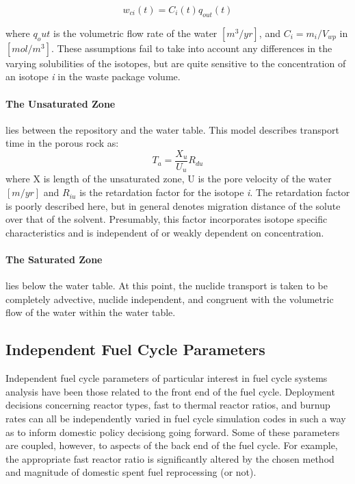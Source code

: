 \begin{equation}
  w_{ci}(t)=C_i(t)q_{out}(t) 
\end{equation}

where $q_out$ is the volumetric flow rate of the water $[m^3/yr]$, and $C_i =
m_i/V_{wp}$ in $[mol/m^3]$. These assumptions fail to take into account any
differences in the varying solubilities of the isotopes, but are quite
sensitive to the concentration of an isotope \emph{i} in the waste package
volume.  

\paragraph{The Unsaturated Zone} lies between the repository and the water
table. This model describes transport time in the porous rock as:
\begin{equation} T_a= \frac{X_u}{U_u}R_{du} \end{equation} where X is length of
the unsaturated zone, U is the pore velocity of the water $[m/yr]$ and $R_{iu}$
is the retardation factor for the isotope \emph{i}. The retardation factor is
poorly described here, but in general denotes migration distance of the solute
over that of the solvent. Presumably, this factor incorporates isotope specific
characteristics and is independent of or weakly dependent on concentration.  

\paragraph{The Saturated Zone} lies below the water table. At this point, the
nuclide transport is taken to be completely advective, nuclide independent, and
congruent with the volumetric flow of the water within the water table. 



\subsection{Independent Fuel Cycle Parameters} Independent fuel cycle
parameters of particular interest in fuel cycle systems analysis have been
those related to the front end of the fuel cycle. Deployment decisions
concerning reactor types, fast to thermal reactor ratios, and burnup rates can
all be independently varied in fuel cycle simulation codes in such a way as to
inform domestic policy decisiong going forward. Some of these parameters are
coupled, however, to aspects of the back end of the fuel cycle. For example,
the appropriate fast reactor ratio is significantly altered by the chosen
method and magnitude of domestic spent fuel reprocessing (or not).

